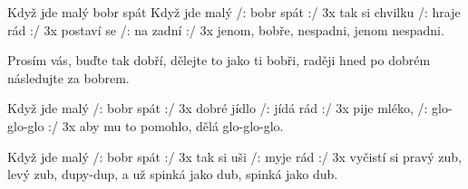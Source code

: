 \begin{TEXT}{Když jde malý bobr spát}
\SLOKA Když jde malý /: bobr spát :/ 3x
tak si chvilku /: hraje rád :/ 3x
postaví se /: na zadní :/ 3x
jenom, bobře, nespadni, jenom nespadni. 

\REFREN Prosím vás, buďte tak dobří, dělejte to jako ti bobři, 
raději hned po dobrém následujte za bobrem. 

\SLOKA Když jde malý /: bobr spát :/ 3x
dobré jídlo /: jídá rád  :/ 3x
pije mléko, /: glo-glo-glo :/ 3x
aby mu to pomohlo, dělá glo-glo-glo. 

\SLOKA Když jde malý /: bobr spát :/ 3x
tak si uši /: myje rád :/ 3x
vyčistí si pravý zub, levý zub, dupy-dup, 
a už spinká jako dub, spinká jako dub. 
\end{TEXT}